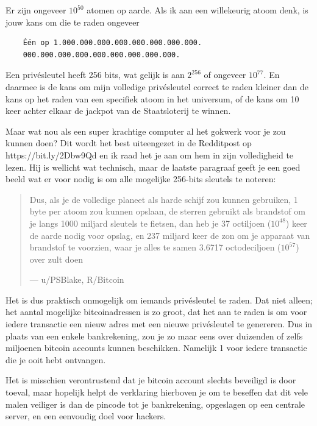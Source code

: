 Er zijn ongeveer $10^{50}$ atomen op aarde. Als ik aan een willekeurig atoom denk, is jouw kans om die te raden ongeveer

\begin{verbatim}
    Één op 1.000.000.000.000.000.000.000.000.
    000.000.000.000.000.000.000.000.000.
\end{verbatim}

Een privésleutel heeft 256 bits, wat gelijk is aan $2^{256}$ of ongeveer $10^{77}$. En daarmee is de kans om mijn volledige privésleutel correct te raden kleiner dan de kans op het raden van een specifiek atoom in het universum, of de kans om 10 keer achter elkaar de jackpot van de Staatsloterij te winnen.

Maar wat nou als een super krachtige computer al het gokwerk voor je zou kunnen doen? Dit wordt het best uiteengezet in de Redditpost op https://bit.ly/2Dbw9Qd en ik raad het je aan om hem in zijn volledigheid te lezen. Hij is wellicht wat technisch, maar de laatste paragraaf geeft je een goed beeld wat er voor nodig is om alle mogelijke 256-bits sleutels te noteren: 

\begin{quotation}
Dus, als je de volledige planeet als harde schijf zou kunnen gebruiken, 1 byte per atoom zou kunnen opslaan, de sterren gebruikt als brandstof om je langs 1000 miljard sleutels te fietsen, dan heb je 37 octiljoen ($10^{48}$) keer de aarde nodig voor opslag, en 237 miljard keer de zon om je apparaat van brandstof te voorzien, waar je alles te samen 3.6717 octodeciljoen  ($10^{57}$)  over zult doen\par\raggedleft--- \textup{u/PSBlake, R/Bitcoin}
\end{quotation}

Het is dus praktisch onmogelijk om iemands privésleutel te raden. Dat niet alleen; het aantal mogelijke bitcoinadressen is zo groot, dat het aan te raden is om voor iedere transactie een nieuw adres met een nieuwe privésleutel te genereren. Dus in plaats van een enkele bankrekening, zou je zo maar eens over duizenden of zelfs miljoenen bitcoin accounts kunnen beschikken. Namelijk 1 voor iedere transactie die je ooit hebt ontvangen.

Het is misschien verontrustend dat je bitcoin account slechts beveiligd is door toeval, maar hopelijk helpt de verklaring hierboven je om te beseffen dat dit vele malen veiliger is dan de pincode tot je bankrekening, opgeslagen op een centrale server, en een eenvoudig doel voor hackers.

